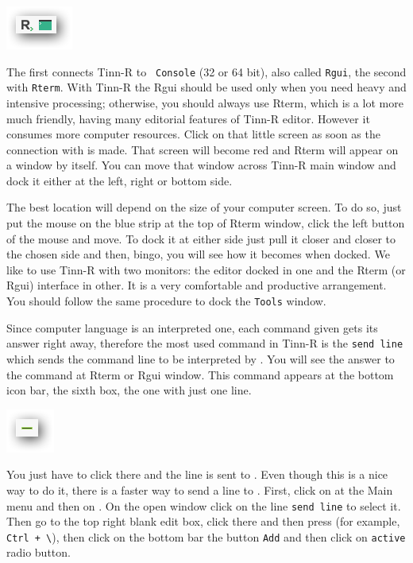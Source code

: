 \includegraphics[scale=0.50]{./res/secrets_connecting.png}

The first connects Tinn-R to \texttt{\RR{} Console} (32 or 64 bit), also called \texttt{Rgui},
the second with \texttt{Rterm}. With Tinn-R the Rgui should be used only when you need heavy and intensive processing;
otherwise, you should always use Rterm, which is a lot more much friendly, having many editorial features of Tinn-R editor.
However it consumes more computer resources. Click on that little screen as soon as the connection with \RR{} is made.
That screen will become red and Rterm will appear on a window by itself. You can move that window across Tinn-R main
window and dock it either at the left, right or bottom side.

The best location will depend on the size of your computer screen. To do so, just put the mouse on the blue strip
at the top of Rterm window, click the left button of the mouse and move.
To dock it at either side just pull it closer and closer to the chosen side and then, bingo,
you will see how it becomes when docked. We like to use Tinn-R with two monitors:
the editor docked in one and the Rterm (or Rgui) interface in other.
It is a very comfortable and productive arrangement.
You should follow the same procedure to dock the \texttt{Tools} window.

Since \RR{} computer language is an interpreted one, each command given gets its answer right away,
therefore the most used command in Tinn-R is the \texttt{send line} which sends the command line to be interpreted by \RR{}.
You will see the answer to the command at Rterm or Rgui window.
This command appears at the bottom icon bar, the sixth box, the one with just one line.

\includegraphics[scale=0.50]{./res/secrets_sendline.png}

You just have to click there and the line is sent to \RR{}. Even though this is a nice way to do it,
there is a faster way to send a line to \RR{}. First, click on \RR{} at the Main menu and then on
.
On the open window click on the line \texttt{send line} to select it.
Then go to the top right blank edit box, click there and then press (for example, \texttt{Ctrl + \textbackslash{}}),
then click on the bottom bar the button \texttt{Add} and then click on \texttt{active} radio button.

